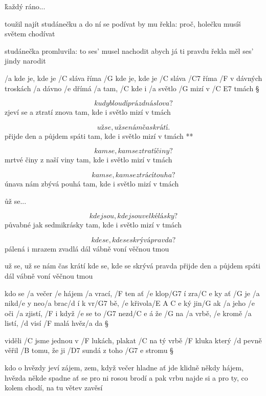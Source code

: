 \r  každý ráno...

toužil najít studánečku
a do ní se podívat
by mu řekla: proč, holečku
musíš světem chodívat \s

studánečka promluvila:
to ses' musel nachodit
abych já ti pravdu řekla
měl ses' jindy narodit

\rr




/a kde je, kde je /C sláva říma
/G kde je, kde je /C sláva /C7 říma
/F v dávných troskách /a dávno /e dřímá
/a tam, /C kde i /a světlo /G mizí v /{C E7} tmách \S

\[ kudy bloudí prázdná slova? \]
zjeví se a ztratí znova
tam, kde i světlo mizí v tmách \s

\R \[ už se, už se nám čas krátí. \]
   přijde den a půjdem spáti
   tam, kde i světlo mizí v tmách **

\[ kam se, kam se ztratí činy? \]
mrtvé činy z naší viny
tam, kde i světlo mizí v tmách \s

\[ kam se, kam se ztrácí touha? \]
únava nám zbývá pouhá
tam, kde i světlo mizí v tmách \s

\r už se...

\[ kde jsou, kde jsou velké lásky? \]
půvabné jak sedmikrásky
tam, kde i světlo mizí v tmách \s

\[ kde se, kde se skrývá pravda? \]
pálená i mrazem zvadlá
dál vábně voní věčnou tmou \s

už se, už se nám čas krátí
kde se, kde se skrývá pravda
přijde den a půjdem spáti
dál vábně voní věčnou tmou




kdo se /a večer /e hájem /a vrací, /F ten ať /e klop/G7 í zra/{C e} ky
ať /G je /a nikd/e y neo/a brac/d í k vr/G7 bě, /e křivola/{E A C e} ký
jin/G ak /a jeho /e oči /a zjistí, /F i když /e se to /G7 nezd/{C e} á
že /G na /a vrbě, /e kromě /a listí, /d visí /F malá hvěz/a da \S

viděli /C jsme jednou v /F lukách, plakat /C na tý vrbě /F kluka
který /d pevně věřil /B tomu, že ji /D7 sundá z toho /{G7 e} stromu \S

kdo o hvězdy jeví zájem, zem, když večer hladne
ať jde klidně někdy hájem, hvězda někde spadne
ať se pro ni rosou brodí a pak vrbu najde si
a pro ty, co kolem chodí, na tu větev zavěsí



